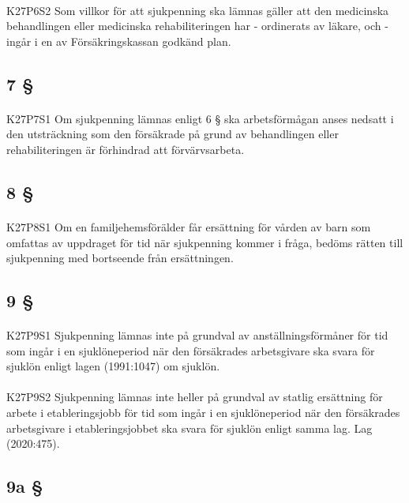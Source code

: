 \documentclass[a4paper,notitlepage,openany,10pt]{book}
\begin{document}
\paragraph*{}
{\tiny K27P6S2}
Som villkor för att sjukpenning ska lämnas gäller att den medicinska behandlingen eller medicinska rehabiliteringen har
\newline - ordinerats av läkare, och
\newline - ingår i en av Försäkringskassan godkänd plan.
\subsection*{7 §}
\paragraph*{}
{\tiny K27P7S1}
Om sjukpenning lämnas enligt 6 § ska arbetsförmågan anses nedsatt i den utsträckning som den försäkrade på grund av behandlingen eller rehabiliteringen är förhindrad att förvärvsarbeta.
\subsection*{8 §}
\paragraph*{}
{\tiny K27P8S1}
Om en familjehemsförälder får ersättning för vården av barn som omfattas av uppdraget för tid när sjukpenning kommer i fråga, bedöms rätten till sjukpenning med bortseende från ersättningen.
\subsection*{9 §}
\paragraph*{}
{\tiny K27P9S1}
Sjukpenning lämnas inte på grundval av anställningsförmåner för tid som ingår i en sjuklöneperiod när den försäkrades arbetsgivare ska svara för sjuklön enligt lagen (1991:1047) om sjuklön.
\paragraph*{}
{\tiny K27P9S2}
Sjukpenning lämnas inte heller på grundval av statlig ersättning för arbete i etableringsjobb för tid som ingår i en sjuklöneperiod när den försäkrades arbetsgivare i etableringsjobbet ska svara för sjuklön enligt samma lag.
Lag (2020:475).
\subsection*{9a §}
\end{document}
